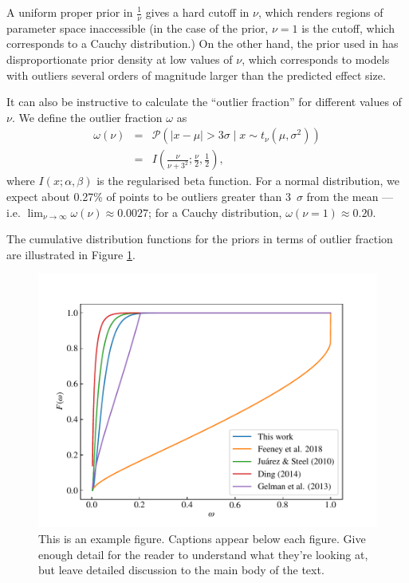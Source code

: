 \documentclass[fleqn,usenatbib]{mnras}
\begin{document}
A uniform proper prior in $\frac1\nu$ gives a hard cutoff in $\nu$, which
renders regions of parameter space inaccessible (in the case of the
\citet{Gelman:2013} prior, $\nu = 1$ is the cutoff, which corresponds to a
Cauchy distribution.) On the other hand, the prior used in \citet{Feeney:2018}
has disproportionate prior density at low values of $\nu$, which corresponds to
models with outliers several orders of magnitude larger than the predicted
effect size.

It can also be instructive to calculate the ``outlier fraction'' for different
values of $\nu$. We define the outlier fraction $\omega$ as
\begin{eqnarray}
    \omega(\nu) &=& \mathcal P\left(|x - \mu| > 3 \sigma \mid x \sim t_\nu (\mu, \sigma^2) \right) \\
    &=& I\left(\frac{\nu}{\nu + 3^2};\frac\nu2, \frac12\right),
\end{eqnarray}
where $I(x; \alpha, \beta)$ is the regularised beta function. For a normal
distribution, we expect about 0.27\% of points to be outliers greater than
3~$\sigma$ from the mean --- i.e. $\lim_{\nu \rightarrow \infty}\omega(\nu)
\approx 0.0027$; for a Cauchy distribution, $\omega(\nu = 1) \approx 0.20$.

The cumulative distribution functions for the priors in terms of outlier
fraction are illustrated in Figure \ref{fig:priors.outlier_frac}.
\begin{figure}
	\includegraphics[width=\columnwidth]{graphics/cdf_outlier_frac}
    \caption{This is an example figure. Captions appear below each figure.
	Give enough detail for the reader to understand what they're looking at,
	but leave detailed discussion to the main body of the text.}
    \label{fig:priors.outlier_frac}
\end{figure}
\end{document}
